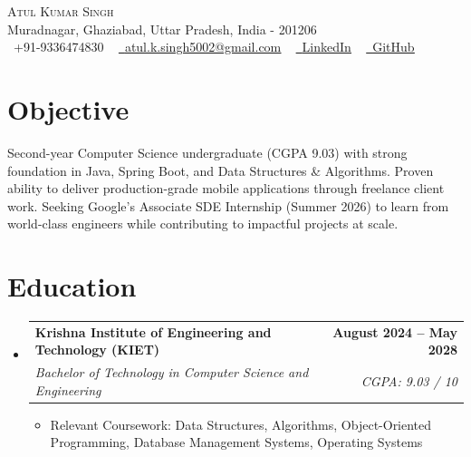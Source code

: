 \documentclass[a4paper,11pt]{article}
\makeatletter
\newcommand{\resumeItem}[1]{
  \item\small{
    {#1 \vspace{-2pt}}
  }
}
\newcommand{\resumeSubheading}[4]{
  \vspace{-2pt}\item
    \begin{tabular*}{1.0\textwidth}[t]{l@{\extracolsep{\fill}}r}
      \textbf{#1} & \textbf{\small #2} \\
      \textit{\small#3} & \textit{\small #4} \\
    \end{tabular*}\vspace{-7pt}
}
\newcommand{\resumeSubHeadingListStart}{\begin{itemize}[leftmargin=0.0in, label={}]}
\newcommand{\resumeSubHeadingListEnd}{\end{itemize}}
\newcommand{\resumeItemListStart}{\begin{itemize}}
\newcommand{\resumeItemListEnd}{\end{itemize}\vspace{-5pt}}
\makeatother
\begin{document}
\begin{center}
    {\Huge \scshape Atul Kumar Singh} \\ \vspace{1pt}
    Muradnagar, Ghaziabad, Uttar Pradesh, India - 201206 \\ \vspace{1pt}
    \small {}\ +91-9336474830 ~ 
    \href{mailto:atul.k.singh5002@gmail.com}{\raisebox{-0.2\height}\faEnvelope\  \underline{atul.k.singh5002@gmail.com}} ~ 
    \href{https://linkedin.com/in/atulkumarsingh5002}{\raisebox{-0.2\height}\faLinkedin\ \underline{LinkedIn}}  ~
    \href{https://github.com/mahakaal2005}{\raisebox{-0.2\height}\faGithub\ \underline{GitHub}}
    \vspace{-8pt}
\end{center}

\section{Objective}
\small{Second-year Computer Science undergraduate (CGPA 9.03) with strong foundation in Java, Spring Boot, and Data Structures \& Algorithms. Proven ability to deliver production-grade mobile applications through freelance client work. Seeking Google's Associate SDE Internship (Summer 2026) to learn from world-class engineers while contributing to impactful projects at scale.}
\vspace{-8pt}

\section{Education}
  \resumeSubHeadingListStart
    \resumeSubheading
      {Krishna Institute of Engineering and Technology (KIET)}{August 2024 -- May 2028}
      {Bachelor of Technology in Computer Science and Engineering}{CGPA: 9.03 / 10}
      \resumeItemListStart
        \resumeItem{Relevant Coursework: Data Structures, Algorithms, Object-Oriented Programming, Database Management Systems, Operating Systems}
      \resumeItemListEnd
  \resumeSubHeadingListEnd

\end{document}
